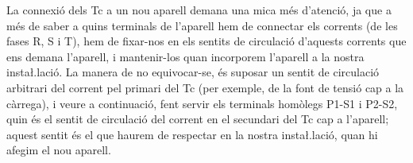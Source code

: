 La connexi\'{o} dels Tc a un nou aparell demana una mica m\'{e}s
d'atenci\'{o}, ja que a m\'{e}s de saber a  quins terminals de l'aparell hem
de connectar els corrents (de les fases R, S i T), hem de fixar-nos
en els sentits de circulaci\'{o} d'aquests corrents que ens demana
l'aparell, i mantenir-los quan incorporem l'aparell a la nostra
insta{\l.l}aci\'{o}. La manera de no equivocar-se, \'{e}s suposar un sentit de
circulaci\'{o} arbitrari del corrent  pel primari del Tc (per exemple,
de la font de tensi\'{o} cap a la c\`{a}rrega), i veure a continuaci\'{o}, fent
servir els terminals hom\`{o}legs P1-S1 i P2-S2, quin \'{e}s el sentit de
circulaci\'{o} del corrent en el secundari del Tc cap a l'aparell;
aquest sentit \'{e}s el que haurem de respectar en la nostra
insta{\l.l}aci\'{o}, quan hi afegim el nou aparell.


